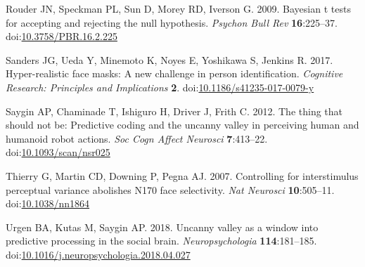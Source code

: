 \documentclass[
]{article}
\newlength{\cslhangindent}
\newlength{\cslentryspacingunit} %
\newenvironment{CSLReferences}[2] %
 {%
  \setlength{\parindent}{0pt}
  \ifodd #1
  \let\oldpar\par
  \def\par{\hangindent=\cslhangindent\oldpar}
  \fi
  \setlength{\parskip}{#2\cslentryspacingunit}
 }%
 {}
\begin{document}
\begin{CSLReferences}{1}{0}
\leavevmode{}%
Rouder JN, Speckman PL, Sun D, Morey RD, Iverson G. 2009. Bayesian t tests for accepting and rejecting the null hypothesis. \emph{Psychon Bull Rev} \textbf{16}:225--37. doi:\href{https://doi.org/10.3758/PBR.16.2.225}{10.3758/PBR.16.2.225}

\leavevmode{}%
Sanders JG, Ueda Y, Minemoto K, Noyes E, Yoshikawa S, Jenkins R. 2017. Hyper-realistic face masks: A new challenge in person identification. \emph{Cognitive Research: Principles and Implications} \textbf{2}. doi:\href{https://doi.org/10.1186/s41235-017-0079-y}{10.1186/s41235-017-0079-y}

\leavevmode{}%
Saygin AP, Chaminade T, Ishiguro H, Driver J, Frith C. 2012. The thing that should not be: Predictive coding and the uncanny valley in perceiving human and humanoid robot actions. \emph{Soc Cogn Affect Neurosci} \textbf{7}:413--22. doi:\href{https://doi.org/10.1093/scan/nsr025}{10.1093/scan/nsr025}

\leavevmode{}%
Thierry G, Martin CD, Downing P, Pegna AJ. 2007. Controlling for interstimulus perceptual variance abolishes N170 face selectivity. \emph{Nat Neurosci} \textbf{10}:505--11. doi:\href{https://doi.org/10.1038/nn1864}{10.1038/nn1864}

\leavevmode{}%
Urgen BA, Kutas M, Saygin AP. 2018. Uncanny valley as a window into predictive processing in the social brain. \emph{Neuropsychologia} \textbf{114}:181--185. doi:\href{https://doi.org/10.1016/j.neuropsychologia.2018.04.027}{10.1016/j.neuropsychologia.2018.04.027}

\end{CSLReferences}
\end{document}
